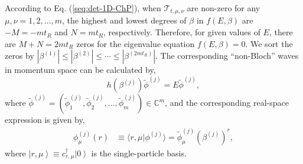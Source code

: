 \documentclass[pdflatex,sn-nature, iicol]{sn-jnl}%
\theoremstyle{thmstyleone}%
\theoremstyle{thmstyletwo}%
\theoremstyle{thmstylethree}%
\begin{document}
According to Eq. (\ref{seq:det-1D-ChP}), when $\mathcal{T}_{t,\mu,\nu}$
are non-zero for any $\mu,\nu=1,2,\dots,m$, the highest and lowest
degrees of $\beta$ in $f\left(E,\beta\right)$ are $-M=-mt_{R}$
and $N=mt_{R}$, respectively. Therefore, for given values of $E$,
there are $M+N=2mt_{R}$ zeros for the eigenvalue equation $f\left(E,\beta\right)=0$.
We sort the zeros by $\left|\beta^{(1)}\right|\leq\left|\beta^{(2)}\right|\leq\cdots\leq\left|\beta^{(2mt_{R})}\right|$.
The corresponding ``non-Bloch'' waves in momentum space can be calculated
by, 
\begin{equation}
h\left(\beta^{(j)}\right)\tilde{\phi}^{(j)}=E\tilde{\phi}^{(j)},\label{seq:non-Bloch-wave-reciprocal}
\end{equation}
where $\tilde{\phi}^{(j)}=(\tilde{\phi}_{1}^{(j)},\tilde{\phi}_{2}^{(j)},\dots,\tilde{\phi}_{m}^{(j)})\in\mathbb{C}^{m}$,
and the corresponding real-space expression is given by, 
\begin{align}
\phi_{\mu}^{(j)}\left(r\right) & \equiv\langle r,\mu|\phi^{(j)}\rangle=\tilde{\phi}_{\mu}^{(j)}\left(\beta^{(j)}\right)^{r},
\end{align}
where $\left|r,\mu\right>\equiv c_{r,\mu}^{\dagger}\left|0\right>$
is the single-particle basis.
\end{document}
